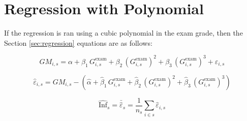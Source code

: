 \documentclass{article}
\begin{document}



\newpage
\appendix
\section{Regression with Polynomial}

If the regression is ran using a cubic polynomial in the exam grade, then the Section \ref{sec:regression} equations are as follows:

\begin{equation}
GM_{i,s} = \alpha 
+ \beta_1 \, G^{\text{exam}}_{i,s} 
+ \beta_2 \, \left(G^{\text{exam}}_{i,s}\right)^2
+ \beta_3 \, \left(G^{\text{exam}}_{i,s}\right)^3
+ \varepsilon_{i,s} \nonumber
\end{equation}

\begin{equation}
\hat{\varepsilon}_{i,s} = GM_{i,s} 
- \left( \hat{\alpha} 
+ \hat{\beta}_1 \, G^{\text{exam}}_{i,s} 
+ \hat{\beta}_2 \, \left(G^{\text{exam}}_{i,s}\right)^2
+ \hat{\beta}_3 \, \left(G^{\text{exam}}_{i,s}\right)^3 \right) \nonumber
\end{equation}

\begin{equation}
\widehat{\text{Inf}}_{s}
= \bar{\hat{\varepsilon}}_{s}
= \frac{1}{n_s}\sum_{i \in s}\hat{\varepsilon}_{i,s} \nonumber
\end{equation}



\end{document}
